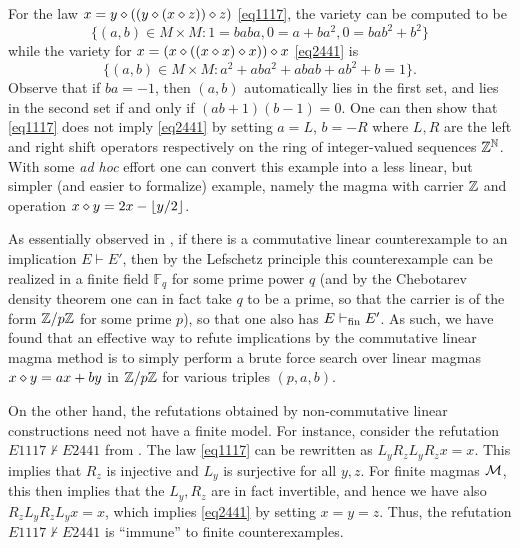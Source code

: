 \begin{example}\label{1117-ex} For the law $x = y \diamond ((y \diamond (x \diamond z)) \diamond z)$ \eqref{eq1117}, the variety  can be computed to be
$$ \{ (a,b) \in M \times M: 1 = baba, 0 = a+ba^2, 0 = bab^2 + b^2 \}$$
while the variety for $x = (x \diamond ((x \diamond x) \diamond x)) \diamond x$ \eqref{eq2441} is
$$ \{ (a,b) \in M \times M: a^2 + aba^2 + abab + ab^2 + b = 1 \}.$$
Observe that if $ba = -1$, then $(a,b)$ automatically lies in the first set, and lies in the second set if and only if $(ab+1)(b-1) = 0$.  One can then show that \eqref{eq1117} does not imply \eqref{eq2441} by setting $a = L$, $b = -R$ where $L, R$ are the left and right shift operators respectively on the ring of integer-valued sequences $\mathbb{Z}^{\mathbb{N}}$.  With some \emph{ad hoc} effort one can convert this example into a less linear, but simpler (and easier to formalize) example, namely the magma with carrier $\mathbb{Z}$ and operation $x \diamond y = 2x - \lfloor y/2 \rfloor$.
\end{example}

\begin{remark} As essentially observed in \cite{austin}, if there is a commutative linear counterexample to an implication $E \vdash E'$, then by the Lefschetz principle this counterexample can be realized in a finite field ${\mathbb F}_q$ for some prime power $q$ (and by the Chebotarev density theorem one can in fact take $q$ to be a prime, so that the carrier is of the form $\mathbb{Z}/p\mathbb{Z}$ for some prime $p$), so that one also has $E \vdash_{\mathrm{fin}} E'$.  As such, we have found that an effective way to refute implications by the commutative linear magma method is to simply perform a brute force search over linear magmas $x \diamond y = ax + by$ in $\mathbb{Z}/p\mathbb{Z}$ for various triples $(p,a,b)$. 

On the other hand, the refutations obtained by non-commutative linear constructions need not have a finite model.  For instance, consider the refutation $E1117 \not \vdash E2441$ from .  The law \eqref{eq1117} can be rewritten as $L_y R_z L_y R_z x = x$.  This implies that $R_z$ is injective and $L_y$ is surjective for all $y,z$.  For finite magmas ${\mathcal{M}}$, this then implies that the $L_y, R_z$ are in fact invertible, and hence we have also $R_z L_y R_z L_y x = x$, which implies \eqref{eq2441} by setting $x=y=z$.  Thus, the refutation $E1117 \not \vdash E2441$ is ``immune'' to finite counterexamples.
\end{remark}

